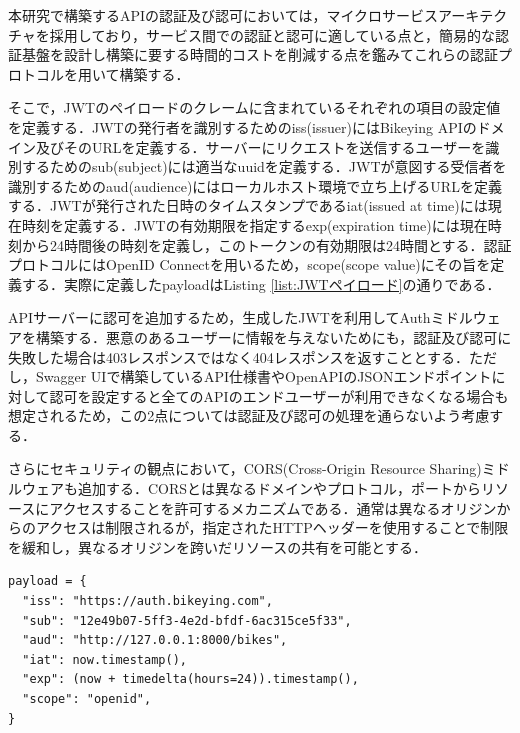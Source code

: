           \par 本研究で構築するAPIの認証及び認可においては，マイクロサービスアーキテクチャを採用しており，サービス間での認証と認可に適している点と，簡易的な認証基盤を設計し構築に要する時間的コストを削減する点を鑑みてこれらの認証プロトコルを用いて構築する．
          \par そこで，JWTのペイロードのクレームに含まれているそれぞれの項目の設定値を定義する．JWTの発行者を識別するためのiss(issuer)にはBikeying APIのドメイン及びそのURLを定義する．サーバーにリクエストを送信するユーザーを識別するためのsub(subject)には適当なuuidを定義する．JWTが意図する受信者を識別するためのaud(audience)にはローカルホスト環境で立ち上げるURLを定義する．JWTが発行された日時のタイムスタンプであるiat(issued at time)には現在時刻を定義する．JWTの有効期限を指定するexp(expiration time)には現在時刻から24時間後の時刻を定義し，このトークンの有効期限は24時間とする．認証プロトコルにはOpenID Connectを用いるため，scope(scope value)にその旨を定義する．実際に定義したpayloadはListing \ref{list:JWTペイロード}の通りである．
          \par APIサーバーに認可を追加するため，生成したJWTを利用してAuthミドルウェアを構築する．悪意のあるユーザーに情報を与えないためにも，認証及び認可に失敗した場合は403レスポンスではなく404レスポンスを返すこととする．ただし，Swagger UIで構築しているAPI仕様書やOpenAPIのJSONエンドポイントに対して認可を設定すると全てのAPIのエンドユーザーが利用できなくなる場合も想定されるため，この2点については認証及び認可の処理を通らないよう考慮する．
          \par さらにセキュリティの観点において，CORS(Cross-Origin Resource Sharing)ミドルウェアも追加する．CORSとは異なるドメインやプロトコル，ポートからリソースにアクセスすることを許可するメカニズムである．通常は異なるオリジンからのアクセスは制限されるが，指定されたHTTPヘッダーを使用することで制限を緩和し，異なるオリジンを跨いだリソースの共有を可能とする\cite{dresen2020corsica}．

\begin{lstlisting}[caption={JWTペイロード}, label={list:JWTペイロード}, basicstyle=\ttfamily\footnotesize]
payload = {
  "iss": "https://auth.bikeying.com",
  "sub": "12e49b07-5ff3-4e2d-bfdf-6ac315ce5f33",
  "aud": "http://127.0.0.1:8000/bikes",
  "iat": now.timestamp(),
  "exp": (now + timedelta(hours=24)).timestamp(),
  "scope": "openid",
}
\end{lstlisting}
